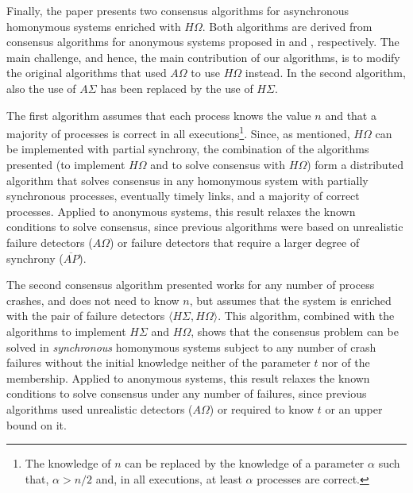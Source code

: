 \documentclass[10pt, conference, compsocconf]{IEEEtran}
\newcommand{\HO}{{H\Omega}}
\newcommand{\AO}{{A\Omega}}
\newcommand{\HS}{{H\Sigma}}
\newcommand{\AS}{{A\Sigma}}
\newcommand{\NAP}{{ \overline{\mathit{AP}}}}
\begin{document}
Finally, the paper presents two consensus algorithms for asynchronous 
homonymous systems enriched with $\HO$. Both algorithms are derived
from consensus algorithms for anonymous systems proposed in 
\cite{DBLP:conf/aina/BonnetR10} and
\cite{DBLP:conf/wdag/BonnetR10}, respectively. 
The main challenge, and hence, the main contribution
of our algorithms, is to modify the original algorithms that 
used $\AO$ to use $\HO$ instead.
In the second algorithm, also the use of $\AS$ has been 
replaced by the use of $\HS$.

The first algorithm assumes that each process knows the value $n$
and that a majority of processes is correct in 
all executions\footnote{The knowledge of $n$ can be replaced 
by the knowledge of a
parameter $\alpha$ such that, $\alpha>n/2$ and, in all executions, 
at least $\alpha$ processes are correct.}. Since, as mentioned,
$\HO$ can be implemented with partial synchrony, the combination of the
algorithms presented (to implement $\HO$ and to solve consensus with $\HO$)
form a distributed algorithm that solves consensus in any homonymous system
with partially synchronous processes, eventually timely  links, and 
a majority of correct processes. Applied to anonymous systems,
this result relaxes the known conditions to solve consensus, since previous
algorithms were based on unrealistic failure 
detectors ($\AO$) or failure  detectors that require
a larger degree of synchrony ($\NAP$).

The second consensus algorithm presented works for any number of process 
crashes, and does not need to know $n$, but assumes that 
the system is  enriched with the pair of failure detectors 
$\langle \HS, \HO\rangle$.
This algorithm, combined with the algorithms to implement 
$\HS$ and $\HO$, shows that the consensus problem 
can be solved in \emph{synchronous} homonymous systems subject to
any number of crash failures without the initial knowledge neither of 
the parameter $t$  nor  of the membership.
Applied to anonymous systems, this result relaxes the known conditions to 
solve consensus under any number of failures, 
since previous algorithms used unrealistic detectors
($\AO$) or required to know $t$ or an upper bound on it.
\end{document}
